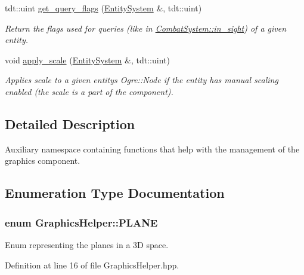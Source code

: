 \begin{DoxyCompactItemize}
tdt\+::uint \hyperlink{namespace_graphics_helper_a176a0d3d47c07e062dafc09453c4bde9}{get\+\_\+query\+\_\+flags} (\hyperlink{class_entity_system}{Entity\+System} \&, tdt\+::uint)
\begin{DoxyCompactList}\small\item\em Return the flags used for queries (like in \hyperlink{class_combat_system_a9e4c1c2747bd800a6766a59f633c7177}{Combat\+System\+::in\+\_\+sight}) of a given entity. \end{DoxyCompactList}\item 
void \hyperlink{namespace_graphics_helper_adfb9194b26586d534ab4a62be1728a2c}{apply\+\_\+scale} (\hyperlink{class_entity_system}{Entity\+System} \&, tdt\+::uint)
\begin{DoxyCompactList}\small\item\em Applies scale to a given entity\textquotesingle{}s Ogre\+::\+Node if the entity has manual scaling enabled (the scale is a part of the component). \end{DoxyCompactList}\end{DoxyCompactItemize}


\subsection{Detailed Description}
Auxiliary namespace containing functions that help with the management of the graphics component. 

\subsection{Enumeration Type Documentation}
\subsubsection[{\texorpdfstring{P\+L\+A\+NE}{PLANE}}]{\setlength{\rightskip}{0pt plus 5cm}enum {\bf Graphics\+Helper\+::\+P\+L\+A\+NE}\hspace{0.3cm}{\ttfamily [strong]}}\hypertarget{namespace_graphics_helper_abb17d8dd557f79c9ea251cdd14bf0fd3}{}\label{namespace_graphics_helper_abb17d8dd557f79c9ea251cdd14bf0fd3}


Enum representing the planes in a 3D space. 



Definition at line 16 of file Graphics\+Helper.\+hpp.



